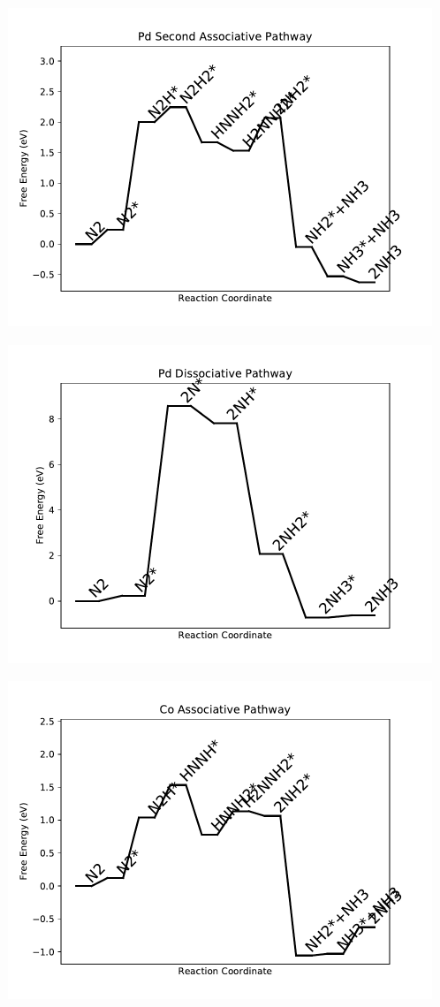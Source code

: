 \begin{figure}
\includegraphics[width=0.8\linewidth]{data/plots/Pd_associative_2.pdf}
\end{figure}

\begin{figure}
\includegraphics[width=0.8\linewidth]{data/plots/Pd_dissociative.pdf}
\end{figure}

\begin{figure}
\includegraphics[width=0.8\linewidth]{data/plots/Co_associative.pdf}
\end{figure}

